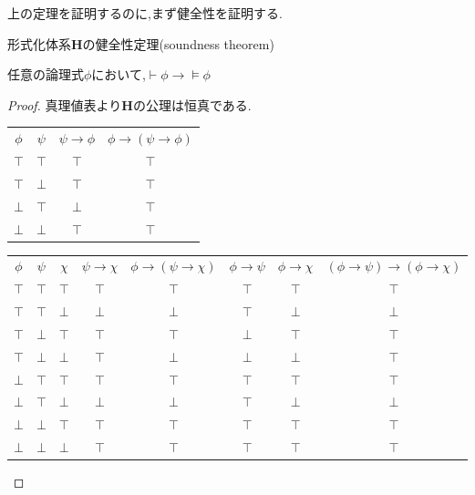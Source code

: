 上の定理を証明するのに,まず健全性を証明する.
\begin{lemma}
 形式化体系$\bm{H}$の健全性定理(soundness theorem)

 任意の論理式$\phi$において,$\vdash \phi \to \models \phi$
\end{lemma}
\begin{proof}
 真理値表より$\bm{H}$の公理は恒真である.
\begin{center}
\begin{tabular}{|c c||c||c|}
\hline
$\phi$ & $\psi$ & $\psi \to \phi$ & $\phi \to (\psi \to \phi)$ \\
\hhline{|==#=#=|}
$\top$ & $\top$ & $\top$ & $\top$ \\
\hline
$\top$ & $\bot$ & $\top$ & $\top$ \\
\hline
$\bot$ & $\top$ & $\bot$ & $\top$ \\
\hline
$\bot$ & $\bot$ & $\top$ & $\top$ \\
\hline
\end{tabular}
\end{center}

\begin{center}
\begin{tabular}{|c c c||c|c||c|c||c|}
\hline
$\phi$ & $\psi$ & $\chi$ & $\psi \to \chi$ & $\phi \to (\psi \to \chi)$ & $\phi \to \psi$ & $ \phi \to \chi $ & $ (\phi \to \psi) \to (\phi \to \chi) $ \\
\hhline{|===#=|=#=|=#=|}
$\top$ & $\top$ & $\top$ & $\top$ & $\top$ & $\top$ & $\top$ & $\top$ \\
\hline
$\top$ & $\top$ & $\bot$ & $\bot$ & $\bot$ & $\top$ & $\bot$ & $\bot$ \\
\hline
$\top$ & $\bot$ & $\top$ & $\top$ & $\top$ & $\bot$ & $\top$ & $\top$ \\
\hline
$\top$ & $\bot$ & $\bot$ & $\top$ & $\bot$ & $\bot$ & $\bot$ & $\top$ \\
\hline
$\bot$ & $\top$ & $\top$ & $\top$ & $\top$ & $\top$ & $\top$ & $\top$ \\
\hline
$\bot$ & $\top$ & $\bot$ & $\bot$ & $\bot$ & $\top$ & $\bot$ & $\bot$ \\
\hline
$\bot$ & $\bot$ & $\top$ & $\top$ & $\top$ & $\top$ & $\top$ & $\top$ \\
\hline
$\bot$ & $\bot$ & $\bot$ & $\top$ & $\top$ & $\top$ & $\top$ & $\top$ \\
\hline
\end{tabular}
\end{center}


\end{proof}
